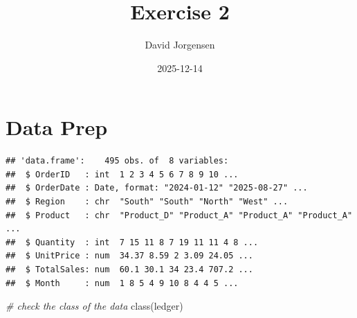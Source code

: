 \documentclass[
]{article}
\title{Exercise 2}
\author{David Jorgensen}
\date{2025-12-14}
\newenvironment{Shaded}{\begin{snugshade}}{\end{snugshade}}
\newcommand{\AttributeTok}[1]{\textcolor[rgb]{0.77,0.63,0.00}{#1}}
\newcommand{\CommentTok}[1]{\textcolor[rgb]{0.56,0.35,0.01}{\textit{#1}}}
\newcommand{\FunctionTok}[1]{\textcolor[rgb]{0.00,0.00,0.00}{#1}}
\newcommand{\NormalTok}[1]{#1}
\newcommand{\OtherTok}[1]{\textcolor[rgb]{0.56,0.35,0.01}{#1}}
\newcommand{\SpecialCharTok}[1]{\textcolor[rgb]{0.00,0.00,0.00}{#1}}
\newcommand{\StringTok}[1]{\textcolor[rgb]{0.31,0.60,0.02}{#1}}
\begin{document}
\maketitle

\hypertarget{data-prep}{%
\section{Data Prep}\label{data-prep}}

\begin{Shaded}
\end{Shaded}

\begin{verbatim}
## 'data.frame':    495 obs. of  8 variables:
##  $ OrderID   : int  1 2 3 4 5 6 7 8 9 10 ...
##  $ OrderDate : Date, format: "2024-01-12" "2025-08-27" ...
##  $ Region    : chr  "South" "South" "North" "West" ...
##  $ Product   : chr  "Product_D" "Product_A" "Product_A" "Product_A" ...
##  $ Quantity  : int  7 15 11 8 7 19 11 11 4 8 ...
##  $ UnitPrice : num  34.37 8.59 2 3.09 24.05 ...
##  $ TotalSales: num  60.1 30.1 34 23.4 707.2 ...
##  $ Month     : num  1 8 5 4 9 10 8 4 4 5 ...
\end{verbatim}

\begin{Shaded}
\begin{Highlighting}[]
\CommentTok{\# check the class of the data}
\FunctionTok{class}\NormalTok{(ledger)}
\end{Highlighting}
\end{Shaded}
\end{document}
